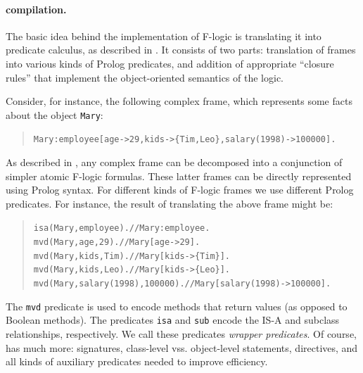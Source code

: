 \documentclass[11pt]{article}
\newcommand{\ERGO}{\mbox{\smaller{\ensuremath{\cal{E}}\smaller{{\sc{RGO}}}}}\xspace}
\newcommand{\FLSYSTEM}{\ERGO}
\newcommand{\fl}{\mbox{F-logic}\xspace}
\begin{document}
\paragraph{\FLSYSTEM compilation.}
The basic idea behind the implementation of \fl is translating it into
predicate calculus, as described in \cite{KLW95}. It consists of two parts:
translation of frames into various kinds of Prolog predicates, and
addition of appropriate ``closure rules'' that implement the
object-oriented semantics of the logic.

Consider, for instance, the following complex frame, which represents
some facts about the object \texttt{Mary}:

\begin{quote}
\begin{alltt}
Mary:employee[age->29, kids->\{Tim,Leo\}, salary(1998)->100000].
\end{alltt}
\end{quote}

As described in \cite{KLW95}, any complex frame can be
decomposed into a conjunction of simpler atomic \fl formulas. These
latter frames can be directly represented using Prolog syntax.  For
different kinds of \fl frames we use different Prolog predicates. For
instance, the result of translating the above frame might be:

\begin{quote}
\begin{alltt}
isa(Mary,employee).            // Mary:employee. 
mvd(Mary,age,29).               // Mary[age->29].
mvd(Mary,kids,Tim).            // Mary[kids->\{Tim\}].
mvd(Mary,kids,Leo).            // Mary[kids->\{Leo\}].
mvd(Mary,salary(1998),100000).  // Mary[salary(1998)->100000].
\end{alltt}
\end{quote}

The {\tt mvd} predicate is used to encode methods that return values (as
opposed to Boolean methods).
The predicates {\tt isa} and {\tt sub}
encode the IS-A and subclass relationships, respectively.
We call these predicates \emph{wrapper predicates}. 
Of course, \FLSYSTEM has much more: signatures, class-level
vss. object-level
statements, directives, and all kinds of auxiliary predicates
needed to improve efficiency.
\end{document}
